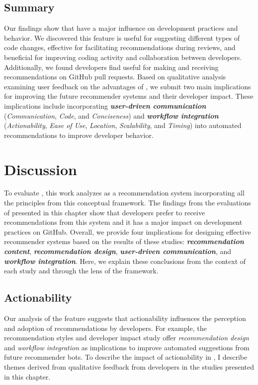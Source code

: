 


\subsection{Summary}

Our findings show that \suggs have a major influence on development practices and behavior. We discovered this feature is useful for suggesting different types of code changes, effective for facilitating recommendations during reviews, and beneficial for improving coding activity and collaboration between developers. Additionally, we found developers find \sugg useful for making and receiving recommendations on GitHub pull requests. Based on qualitative analysis examining user feedback on the advantages of \sugg, we submit two main implications for improving the future recommender systems and their developer impact. These implications include incorporating \textbf{\em user-driven communication} (\textit{Communication}, \textit{Code}, and \textit{Conciseness}) and \textbf{\em workflow integration} (\textit{Actionability}, \textit{Ease of Use}, \textit{Location}, \textit{Scalability}, and \textit{Timing}) into automated recommendations to improve developer behavior.

\section{Discussion}

To evaluate \framework, this work analyzes \suggs as a recommendation system incorporating all the principles from this conceptual framework. The findings from the evaluations of \sugg presented in this chapter show that developers prefer to receive recommendations from this system and it has a major impact on development practices on GitHub. Overall, we provide four implications for designing effective recommender systems based on the results of these studies: \textbf{\em recommendation content}, \textbf{\em recommendation design}, \textbf{\em user-driven communication}, and \textbf{\em workflow integration}. Here, we explain these conclusions from the context of each study and through the lens of the \framework framework.

\subsection{Actionability}

Our analysis of the \suggs feature suggests that actionability influences the perception and adoption of recommendations by developers. For example, the recommendation styles and developer impact study offer \textit{recommendation design} and \textit{workflow integration} as implications to improve automated suggestions from future recommender bots. To describe the impact of actionability in \sugg, I describe themes derived from qualitative feedback from developers in the studies presented in this chapter.

